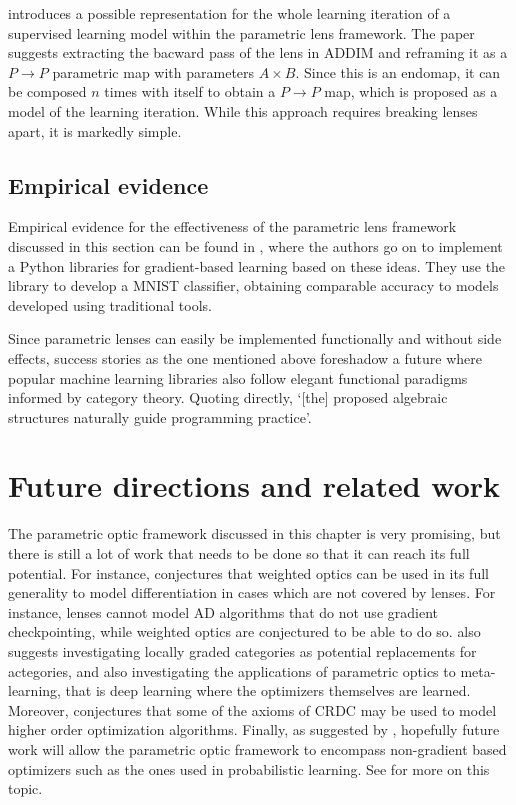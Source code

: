 \documentclass[11pt,a4paper,openright,twoside]{report}
\theoremstyle{plain}
\theoremstyle{definition}
\begin{document}
\cite{cruttwell2022categorical} introduces a possible representation for the whole learning iteration of a supervised learning model within the parametric lens framework. The paper suggests extracting the bacward pass of the lens in ADDIM and reframing it as a $P \to P$ parametric map with parameters $A \times B$. Since this is an endomap, it can be composed $n$ times with itself to obtain a $P \to P$ map, which is proposed as a model of the learning iteration. While this approach requires breaking lenses apart, it is markedly simple.


\subsection{Empirical evidence}

Empirical evidence for the effectiveness of the parametric lens framework discussed in this section can be found in \cite{cruttwell2022categorical}, where the authors go on to implement a Python libraries for gradient-based learning based on these ideas. They use the library to develop a MNIST classifier, obtaining comparable accuracy to models developed using traditional tools.


Since parametric lenses can easily be implemented functionally and without side effects, success stories as the one mentioned above foreshadow a future where popular machine learning libraries also follow elegant functional paradigms informed by category theory. Quoting  \cite{cruttwell2022categorical} directly, \lq[the] proposed algebraic structures naturally guide programming practice\rq.


\section{Future directions and related work}

The parametric optic framework discussed in this chapter is very promising, but there is still a lot of work that needs to be done so that it can reach its full potential. For instance, \cite{gavranovic2024fundamental} conjectures that weighted optics can be used in its full generality to model differentiation in cases which are not covered by lenses. For instance, lenses cannot model AD algorithms that do not use gradient checkpointing, while weighted optics are conjectured to be able to do so. \cite{gavranovic2024fundamental} also suggests investigating locally graded categories as potential replacements for actegories, and also investigating the applications of parametric optics to meta-learning, that is deep learning where the optimizers themselves are learned. Moreover, \cite{cruttwell2022categorical} conjectures that some of the axioms of CRDC may be used to model higher order optimization algorithms. Finally, as suggested by \cite{cruttwell2022categorical}, hopefully future work will allow the parametric optic framework to encompass non-gradient based optimizers such as the ones used in probabilistic learning. See \cite{shiebler2021category} for more on this topic.
\end{document}
